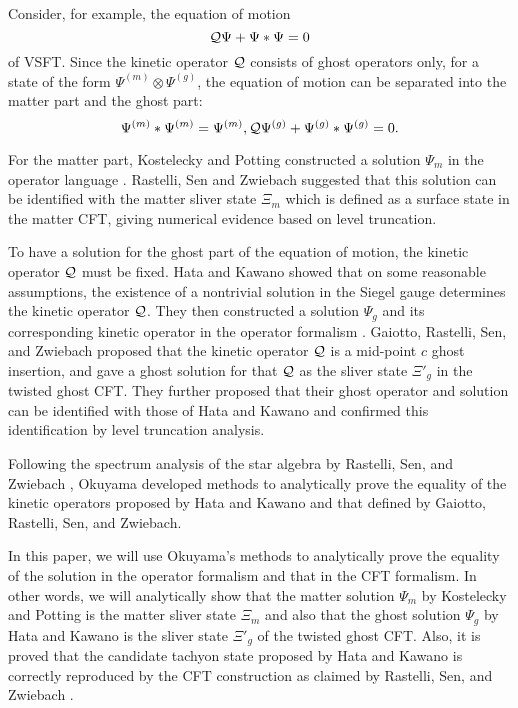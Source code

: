\documentclass[a4paper,12pt]{article}
\begin{document}
Consider, for example, the equation of motion
\begin{equation}
{\cal Q} \Psi + \Psi \ast \Psi = 0
\end{equation}
of VSFT. Since the kinetic operator $\cal{Q}$ consists of ghost
operators only, for a state of the form $\Psi^{(m)}\otimes
\Psi^{(g)}$, the equation of motion can be separated into the
matter part and the ghost part:
\begin{equation}
\Psi^{(m)} \ast \Psi^{(m)} =\Psi^{(m)},
{\cal Q}\Psi^{(g)}+\Psi^{(g)}\ast \Psi^{(g)}=0.
\end{equation}

For the matter part, Kostelecky and Potting
constructed a solution $\Psi_m$
in the operator language \cite{Kostelecky-Potting}.
Rastelli, Sen and Zwiebach suggested \cite{RSZclassical} that
this solution can be identified with the matter sliver state $\Xi_m$
which is defined as a surface state in the matter CFT,
giving numerical evidence based on level truncation.

To have a solution for the ghost part of the equation of motion,
the kinetic operator ${\cal Q}$ must be fixed.
Hata and Kawano showed that on some reasonable assumptions,
the existence of a nontrivial solution in the Siegel gauge
determines the kinetic operator ${\cal Q}$.
They then constructed a solution $\Psi_g$ and its corresponding kinetic
operator in the operator formalism \cite{Hata-Kawano}.
Gaiotto, Rastelli, Sen, and Zwiebach proposed
\cite{GRSZstructure} \cite{RSZnote}
that the kinetic operator ${\cal Q}$ is a mid-point
$c$ ghost insertion, and gave a ghost solution for
that ${\cal Q}$ as the sliver state
${\Xi'_g}$ in the twisted ghost CFT.
They further proposed that their ghost operator and solution can be
identified with those of Hata and Kawano and confirmed this identification
by level truncation analysis.

Following the spectrum analysis of the star algebra by Rastelli,
Sen, and Zwiebach \cite{RSZspectroscopy},
Okuyama  developed methods \cite{Okuyama-kinetic}
to analytically prove the equality
of the kinetic operators proposed by Hata and Kawano and that defined by
Gaiotto, Rastelli, Sen, and Zwiebach.

In this paper, we will use Okuyama's methods to analytically prove
the equality of the solution in the operator formalism and that in
the CFT formalism. In other words, we will analytically show that
the matter solution $\Psi_m$ by Kostelecky and Potting is the
matter sliver state $\Xi_m$ and also that the ghost solution
$\Psi_g$ by Hata and Kawano is the sliver state $\Xi'_g$ of the
twisted ghost CFT. Also, it is proved that the candidate tachyon
state proposed by Hata and Kawano is correctly reproduced by the
CFT construction as claimed by Rastelli, Sen, and Zwiebach \cite{RSZnote}.
\end{document}
